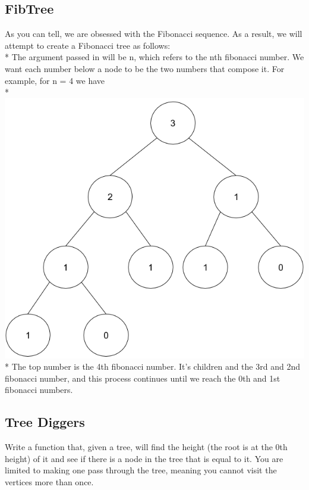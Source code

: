 \documentclass{article}
\begin{document}
\subsection{FibTree}
As you can tell, we are obsessed with the Fibonacci sequence. As a result, we will attempt to create a Fibonacci tree as follows: \\*
\bigskip
The argument passed in will be n, which refers to the nth fibonacci number. We want each number below a node to be the two numbers that compose it. For example, for n = 4 we have \\*
\includegraphics[scale=.35]{../images/fibtree} \\*
The top number is the 4th fibonacci number. It's children and the 3rd and 2nd fibonacci number, and this process continues until we reach the 0th and 1st fibonacci numbers. 
\bigskip
\bigskip
\bigskip
\bigskip
\bigskip
\bigskip
\bigskip
\bigskip
\bigskip
\bigskip
\bigskip
\bigskip
\bigskip
\bigskip
\bigskip
\bigskip
\bigskip
\bigskip
\bigskip
\bigskip
\bigskip
\bigskip
\bigskip
\bigskip
 \subsection{Tree Diggers}
 Write a function that, given a tree, will find the height (the root is at the 0th height) of it and see if there is a node in the tree that is equal to it. You are limited to making one pass through the tree, meaning you cannot visit the vertices more than once.
\bigskip
\bigskip
\bigskip
\bigskip
\bigskip
\bigskip
\bigskip
\bigskip
\bigskip
\bigskip
\bigskip
\bigskip
\bigskip
\bigskip
\bigskip
\bigskip
\newpage
\end{document}

